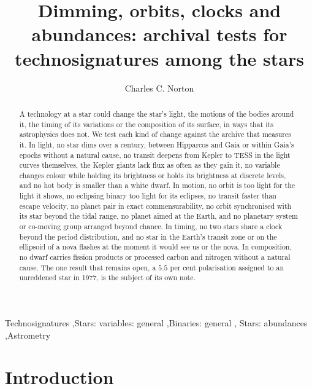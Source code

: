\documentclass[3p,11pt]{elsarticle}
\begin{document}
\begin{frontmatter}

\title{Dimming, orbits, clocks and abundances: archival tests for technosignatures among the stars}

\author{Charles C. Norton}

\begin{abstract}
A technology at a star could change the star's light, the motions of the bodies around
it, the timing of its variations or the composition of its surface, in ways that its
astrophysics does not. We test each kind of change against the archive that measures
it. In light, no star dims over a century, between Hipparcos and Gaia or within Gaia's
epochs without a natural cause, no transit deepens from Kepler to TESS in the light curves
themselves, the Kepler giants lack flux as often as they gain it,
no variable changes colour while holding its brightness or holds its brightness at
discrete levels, and no hot body is smaller than a white dwarf. In motion, no orbit is
too light for the light it shows, no eclipsing binary too
light for its eclipses, no transit faster than escape velocity, no planet pair in exact
commensurability, no orbit synchronised with its star beyond the tidal range, no
planet aimed at the Earth, and no planetary system or co-moving group arranged beyond
chance. In timing, no two stars share a clock beyond the period distribution, and
no star in the Earth's transit zone or on the ellipsoid of a nova flashes at the moment
it would see us or the nova. In composition, no dwarf carries fission products
or processed carbon and nitrogen without a natural cause. The one result that remains
open, a $5.5$ per cent polarisation assigned to an unreddened star in 1977, is the
subject of its own note.
\end{abstract}

\begin{keyword}
Technosignatures \sep Stars: variables: general \sep Binaries: general \sep
Stars: abundances \sep Astrometry
\end{keyword}

\end{frontmatter}

\section{Introduction}\label{sec:intro}
\end{document}
